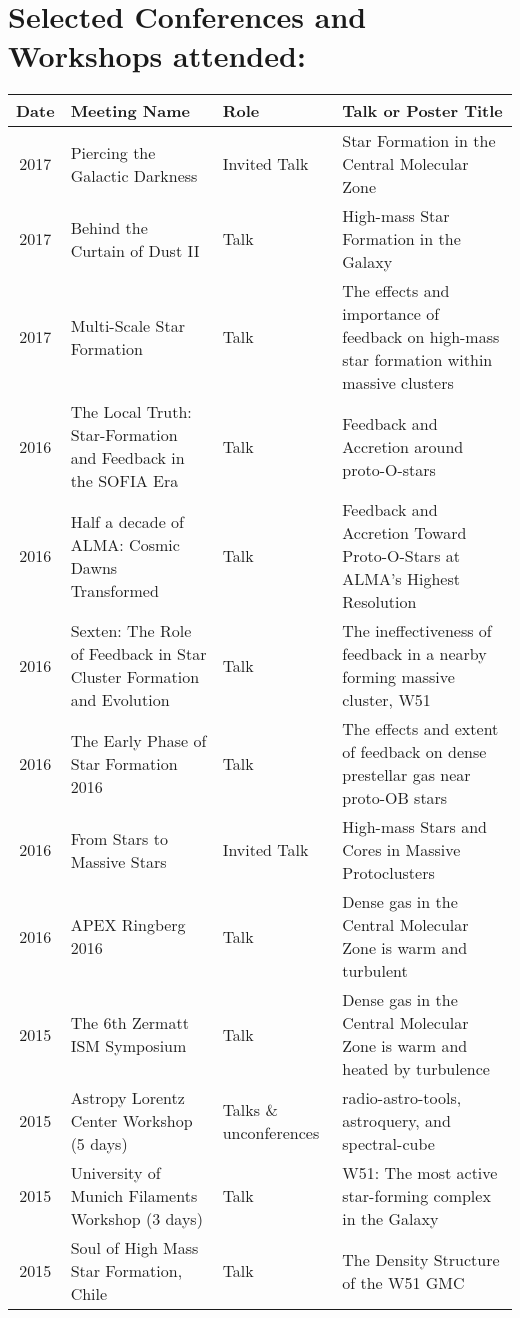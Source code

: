 \setlength{\extrarowheight}{4pt}
\section*{Selected Conferences and Workshops attended: }
\vspace{-12pt}
\begin{tabular}{cp{1.8in}p{1.5cm}p{3.0in}}
    Date & Meeting Name & Role & Talk or Poster Title \\
                \hline
    2017 &      Piercing the Galactic Darkness & Invited Talk & Star Formation in the Central Molecular Zone \\
    2017 &      Behind the Curtain of Dust II & Talk & High-mass Star Formation in the Galaxy \\
    2017 &      Multi-Scale Star Formation & Talk & The effects and importance of feedback on high-mass star formation within massive clusters \\
    2016 &      The Local Truth: Star-Formation and Feedback in the SOFIA Era & Talk & Feedback and Accretion around proto-O-stars \\
    2016 &      Half a decade of ALMA: Cosmic Dawns Transformed & Talk & Feedback and Accretion Toward Proto-O-Stars at ALMA's Highest Resolution \\
    2016 &      Sexten: The Role of Feedback in Star Cluster Formation and Evolution  & Talk & The ineffectiveness of feedback in a nearby forming massive cluster, W51 \\
    2016 &      The Early Phase of Star Formation 2016 & Talk & The effects and extent of feedback on dense prestellar gas near proto-OB stars \\
    2016 &      From Stars to Massive Stars & Invited Talk & High-mass Stars and Cores in Massive Protoclusters \\
    2016 &      APEX Ringberg 2016 & Talk & Dense gas in the Central Molecular Zone is warm and turbulent \\
    2015 &      The 6th Zermatt ISM Symposium & Talk & Dense gas in the Central Molecular Zone is warm and heated by turbulence \\
    2015 &      Astropy Lorentz Center Workshop (5 days) & Talks \& unconferences & radio-astro-tools, astroquery, and spectral-cube \\ 
    2015 &      University of Munich Filaments Workshop (3 days) & Talk & W51: The most active star-forming complex in the Galaxy \\
    2015 &      Soul of High Mass Star Formation, Chile & Talk & The Density Structure of the W51 GMC \\

\end{tabular}
